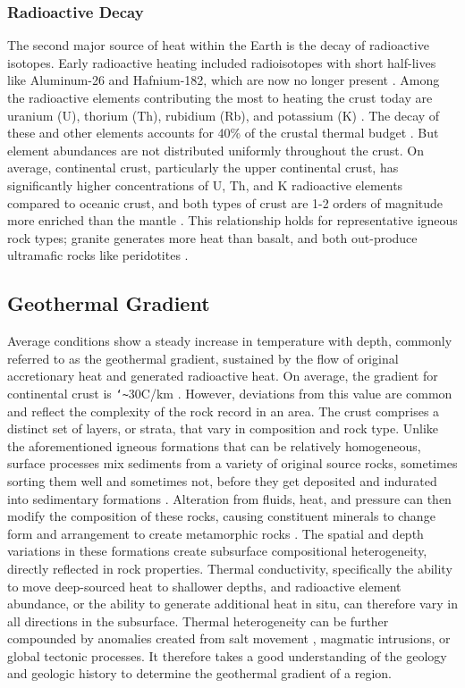\subsubsection{Radioactive Decay}
The second major source of heat within the Earth is the decay of radioactive isotopes. Early radioactive heating included radioisotopes with short half-lives like Aluminum-26 and Hafnium-182, which are now no longer present \citep[~p. 16]{glassley_geothermal_2015}. Among the radioactive elements contributing the most to heating the crust today are uranium (U), thorium (Th), rubidium (Rb), and potassium (K) \citep[~p. 17]{glassley_geothermal_2015}. The decay of these and other elements accounts for 40\% of the crustal thermal budget \citep{stein_heat_1995}. But element abundances are not distributed uniformly throughout the crust. On average, continental crust, particularly the upper continental crust, has significantly higher concentrations of U, Th, and K radioactive elements compared to oceanic crust, and both types of crust are 1-2 orders of magnitude more enriched than the mantle \citep[~p. 276]{fowler_solid_2005}. This relationship holds for representative igneous rock types; granite generates more heat than basalt, and both out-produce ultramafic rocks like peridotites \citep[~p. 276]{fowler_solid_2005}. 
\subsection{Geothermal Gradient}
Average conditions show a steady increase in temperature with depth, commonly referred to as the geothermal gradient, sustained by the flow of original accretionary heat and generated radioactive heat. On average, the gradient for continental crust is \texttt{\char`\~}30\textdegree C/km \citep[~p. 209]{press_understanding_2004}. However, deviations from this value are common and reflect the complexity of the rock record in an area. The crust comprises a distinct set of layers, or strata, that vary in composition and rock type. Unlike the aforementioned igneous formations that can be relatively homogeneous, surface processes mix sediments from a variety of original source rocks, sometimes sorting them well and sometimes not, before they get deposited and indurated into sedimentary formations \citep[~p. 164-168]{press_understanding_2004}. Alteration from fluids, heat, and pressure can then modify the composition of these rocks, causing constituent minerals to change form and arrangement to create metamorphic rocks \citep[~p. 195-205]{press_understanding_2004}. The spatial and depth variations in these formations create subsurface compositional heterogeneity, directly reflected in rock properties. Thermal conductivity, specifically the ability to move deep-sourced heat to shallower depths, and radioactive element abundance, or the ability to generate additional heat in situ, can therefore vary in all directions in the subsurface. Thermal heterogeneity can be further compounded by anomalies created from salt movement \citep[~p. 164-168]{press_understanding_2004}, magmatic intrusions, or global tectonic processes. It therefore takes a good understanding of the geology and geologic history to determine the geothermal gradient of a region.

